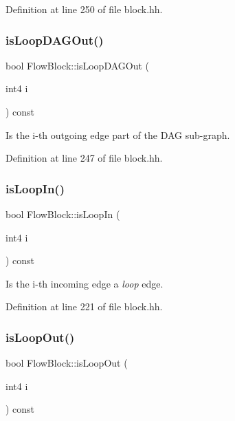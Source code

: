 Definition at line 250 of file block.\+hh.

\mbox{\label{class_flow_block_a82b1e9b66bef1b34d2f5136b61cadbe9}} 
\subsubsection{\texorpdfstring{isLoopDAGOut()}{isLoopDAGOut()}}
{\footnotesize\ttfamily bool Flow\+Block\+::is\+Loop\+D\+A\+G\+Out (\begin{DoxyParamCaption}\item[{int4}]{i }\end{DoxyParamCaption}) const\hspace{0.3cm}{\ttfamily [inline]}}



Is the i-\/th outgoing edge part of the D\+AG sub-\/graph. 



Definition at line 247 of file block.\+hh.

\mbox{\label{class_flow_block_a1f96ae0843d407d233e21d071855e19b}} 
\subsubsection{\texorpdfstring{isLoopIn()}{isLoopIn()}}
{\footnotesize\ttfamily bool Flow\+Block\+::is\+Loop\+In (\begin{DoxyParamCaption}\item[{int4}]{i }\end{DoxyParamCaption}) const\hspace{0.3cm}{\ttfamily [inline]}}



Is the i-\/th incoming edge a {\itshape loop} edge. 



Definition at line 221 of file block.\+hh.

\mbox{\label{class_flow_block_aec8b1d9c9c0fc5918dc1665a5161aea2}} 
\subsubsection{\texorpdfstring{isLoopOut()}{isLoopOut()}}
{\footnotesize\ttfamily bool Flow\+Block\+::is\+Loop\+Out (\begin{DoxyParamCaption}\item[{int4}]{i }\end{DoxyParamCaption}) const\hspace{0.3cm}{\ttfamily [inline]}}



